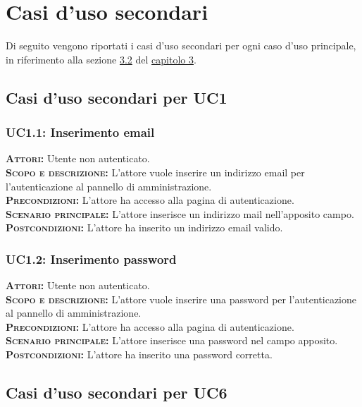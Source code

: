
\appendix
\chapter{Casi d'uso secondari}
\label{sec:AppendixA}
Di seguito vengono riportati i casi d'uso secondari per ogni caso d'uso principale, in riferimento alla sezione \hyperref[sec:usecase]{3.2} del \hyperref[sec:chap3]{capitolo 3}.
\setlength{\parindent}{0cm}
\section{Casi d'uso secondari per UC1}
\subsection{UC1.1: Inserimento email}
\label{sec:uc11}
\textsc{\textbf{Attori:}} Utente non autenticato.\\
\textsc{\textbf{Scopo e descrizione:}} L'attore vuole inserire un indirizzo email per l'autenticazione al pannello di amministrazione.\\
\textsc{\textsc{\textbf{Precondizioni:}}} L'attore ha accesso alla pagina di autenticazione.\\
\textsc{\textbf{Scenario principale:}} L'attore inserisce un indirizzo mail nell'apposito campo.\\
\textsc{\textbf{Postcondizioni:}} L'attore ha inserito un indirizzo email valido.

\subsection{UC1.2: Inserimento password}
\label{sec:uc12}
\textsc{\textbf{Attori:}} Utente non autenticato.\\
\textsc{\textbf{Scopo e descrizione:}} L'attore vuole inserire una password per l'autenticazione al pannello di amministrazione.\\
\textsc{\textsc{\textbf{Precondizioni:}}} L'attore ha accesso alla pagina di autenticazione.\\
\textsc{\textbf{Scenario principale:}} L'attore inserisce una password nel campo apposito.\\
\textsc{\textbf{Postcondizioni:}} L'attore ha inserito una password corretta.

\section{Casi d'uso secondari per UC6}
